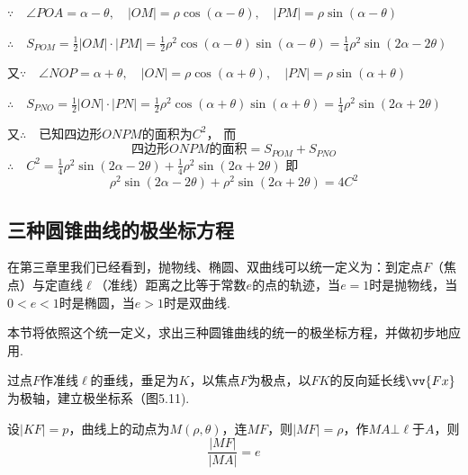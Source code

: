 \begin{solution}
$\because\quad \angle POA=\alpha-\theta,\quad |OM|=\rho\cos(\alpha-\theta),\quad |PM|=\rho\sin(\alpha-\theta)$

$\therefore\quad S_{POM}=\frac{1}{2}|OM|\cdot |PM|=\frac{1}{2}\rho^2\cos(\alpha-\theta)\sin (\alpha-\theta)=\frac{1}{4}\rho^2 \sin (2\alpha-2\theta)$

又$\because\quad \angle NOP=\alpha+\theta,\quad |ON|=\rho\cos(\alpha+\theta),\quad |PN|=\rho\sin(\alpha+\theta)$

$\therefore\quad S_{PNO}=\frac{1}{2}|ON|\cdot |PN|=\frac{1}{2}\rho^2\cos(\alpha+\theta)\sin (\alpha+\theta)=\frac{1}{4}\rho^2\sin (2\alpha+2\theta)$

又$\therefore\quad $已知四边形$ONPM$的面积为$C^2$，
而
\[\text{四边形$ONPM$的面积}=S_{POM}+S_{PNO}\]
$\therefore\quad C^2=\frac{1}{4}\rho^2 \sin(2\alpha-2\theta)+\frac{1}{4}\rho^2\sin(2\alpha+2\theta)$
即
\[\rho^2\sin(2\alpha-2\theta)+\rho^2\sin(2\alpha+2\theta)=4C^2\]

\subsection{三种圆锥曲线的极坐标方程}

在第三章里我们已经看到，抛物线、椭圆、双曲线可以统一定义为：到定点$F$（焦点）与定直线$\ell$（准线）距离之比等于常数$e$的点的轨迹，当$e=1$时是抛物线，当$0<e<1$时是椭圆，当$e>1$时是双曲线.

本节将依照这个统一定义，求出三种圆锥曲线的统一的极坐标方程，并做初步地应用.

\noindent
\begin{minipage}{.5\textwidth}
\CTEXindent
    过点$F$作准线$\ell$的垂线，垂足为$K$，以焦点$F$为极点，以$FK$的反向延长线$\vv{Fx}$为极轴，建立极坐标系（图5.11).

    设$|KF|=p$，曲线上的动点为$M(\rho,\theta)$，连$MF$，则$|MF|=\rho$，作$MA\bot\ell$于$A$，则
    \[\frac{|MF|}{|MA|}=e\]
\end{minipage}
\hfill
\begin{minipage}{.45\textwidth}
\centering
{}
\end{minipage}
\end{solution}
